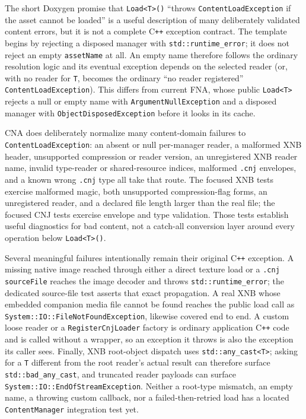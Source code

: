 The short Doxygen promise that \texttt{Load<T>()} ``throws \texttt{ContentLoadException} if the
asset cannot be loaded'' is a useful description of many deliberately validated content errors,
but it is not a complete C\texttt{++} exception contract. The template begins by rejecting a
disposed manager with \texttt{std::runtime\_error}; it does not reject an empty
\texttt{assetName} at all. An empty name therefore follows the ordinary resolution logic and its
eventual exception depends on the selected reader (or, with no reader for \texttt{T}, becomes the
ordinary ``no reader registered'' \texttt{ContentLoadException}). This differs from current FNA,
whose public \texttt{Load<T>} rejects a null or empty name with
\texttt{ArgumentNullException} and a disposed manager with \texttt{ObjectDisposedException}
before it looks in its cache.

CNA does deliberately normalize many content-domain failures to
\texttt{ContentLoadException}: an absent or null per-manager reader, a malformed XNB header,
unsupported compression or reader version, an unregistered XNB reader name, invalid type-reader
or shared-resource indices, malformed \texttt{.cnj} envelopes, and a known wrong \texttt{.cnj}
type all take that route. The focused XNB tests exercise malformed magic, both unsupported
compression-flag forms, an unregistered reader, and a declared file length larger than the real
file; the focused CNJ tests exercise envelope and type validation. Those tests establish useful
diagnostics for bad content, not a catch-all conversion layer around every operation below
\texttt{Load<T>()}.

Several meaningful failures intentionally remain their original C\texttt{++} exception. A
missing native image reached through either a direct texture load or a \texttt{.cnj}
\texttt{sourceFile} reaches the image decoder and throws \texttt{std::runtime\_error}; the
dedicated source-file test asserts that exact propagation. A real XNB  whose
embedded companion media file cannot be found reaches the public load call as
\texttt{System::IO::FileNotFoundException}, likewise covered end to end. A custom loose reader
or a \texttt{RegisterCnjLoader} factory is ordinary application C\texttt{++} code and is called
without a wrapper, so an exception it throws is also the exception its caller sees. Finally, XNB
root-object dispatch uses \texttt{std::any\_cast<T>}; asking for a \texttt{T} different from the
root reader's actual result can therefore surface \texttt{std::bad\_any\_cast}, and truncated
reader payloads can surface \texttt{System::IO::EndOfStreamException}. Neither a root-type
mismatch, an empty name, a throwing custom callback, nor a failed-then-retried load has a located
\texttt{ContentManager} integration test yet.

